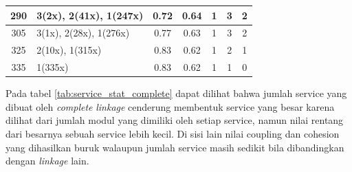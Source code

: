 \begin{small}
\begin{longtable}{|c|p{4cm}|c|c|c|c|c|}
290 & 3(2x), 2(41x), 1(247x) & \cellcolor{colorBad}  0.72 & \cellcolor{colorBad} 0.64 & 1 & 3 & \cellcolor{colorGood} 2 \\   \hline
305 & 3(1x), 2(28x), 1(276x) & \cellcolor{colorBad}  0.77 & \cellcolor{colorBad} 0.63 & 1 & 3 & \cellcolor{colorGood} 2 \\   \hline
325 & 2(10x), 1(315x) & \cellcolor{colorBad}  0.83 & \cellcolor{colorBad} 0.62 & 1 & 2 & \cellcolor{colorGood} 1 \\   \hline
335 & 1(335x) & \cellcolor{colorBad}  0.83 & \cellcolor{colorBad} 0.62 & 1 & 1 & \cellcolor{colorGood} 0 \\   \hline
	\end{longtable}
\end{small}
\endgroup

Pada tabel \ref{tab:service_stat_complete} dapat dilihat bahwa jumlah service yang dibuat oleh \textit{complete} \textit{linkage} cenderung membentuk service yang besar karena dilihat dari jumlah modul yang dimiliki oleh setiap service, namun nilai rentang dari besarnya sebuah service lebih kecil. Di sisi lain nilai coupling dan cohesion yang dihasilkan buruk walaupun jumlah service masih sedikit bila dibandingkan dengan \textit{linkage} lain.

